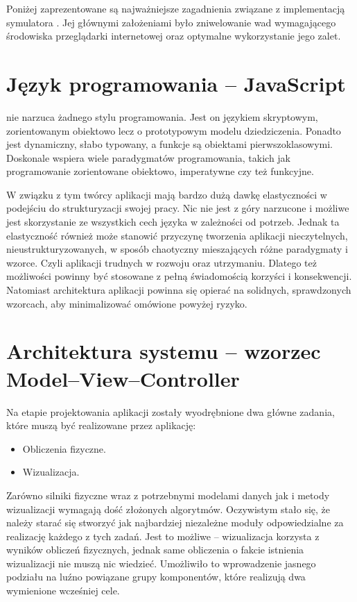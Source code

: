 Poniżej zaprezentowane są najważniejsze zagadnienia związane z implementacją
symulatora \en. Jej głównymi założeniami było zniwelowanie wad wymagającego
środowiska przeglądarki internetowej oraz optymalne wykorzystanie jego zalet.

\section{Język programowania -- JavaScript}

\js nie narzuca żadnego stylu programowania. Jest on językiem skryptowym,
zorientowanym obiektowo lecz o prototypowym modelu dziedziczenia. Ponadto jest
dynamiczny, słabo typowany, a funkcje są obiektami pierwszoklasowymi. Doskonale
wspiera wiele paradygmatów programowania, takich jak programowanie zorientowane
obiektowo, imperatywne czy też funkcyjne.

W związku z tym twórcy aplikacji mają bardzo dużą dawkę elastyczności w
podejściu do strukturyzacji swojej pracy. Nic nie jest z góry narzucone i
możliwe jest skorzystanie ze wszystkich cech języka w zależności od potrzeb.
Jednak ta elastyczność również może stanowić przyczynę tworzenia aplikacji
nieczytelnych, nieustrukturyzowanych, w sposób chaotyczny mieszających różne
paradygmaty i wzorce. Czyli aplikacji trudnych w rozwoju oraz utrzymaniu.
Dlatego też możliwości \js powinny być stosowane z pełną świadomością korzyści i
konsekwencji. Natomiast architektura aplikacji powinna się opierać na solidnych,
sprawdzonych wzorcach, aby minimalizować omówione powyżej ryzyko.

\section{Architektura systemu -- wzorzec Model--View--Controller}

Na etapie projektowania aplikacji zostały wyodrębnione dwa główne zadania,
które muszą być realizowane przez aplikację:
\begin{itemize}
\item Obliczenia fizyczne.
\item Wizualizacja.
\end{itemize}

Zarówno silniki fizyczne wraz z potrzebnymi modelami danych jak i metody
wizualizacji wymagają dość złożonych algorytmów. Oczywistym stało się, że należy
starać się stworzyć jak najbardziej niezależne moduły odpowiedzialne za
realizację każdego z tych zadań. Jest to możliwe -- wizualizacja korzysta z
wyników obliczeń fizycznych, jednak same obliczenia o fakcie istnienia
wizualizacji nie muszą nic wiedzieć. Umożliwiło to wprowadzenie jasnego podziału
na luźno powiązane grupy komponentów, które realizują dwa wymienione wcześniej
cele.


